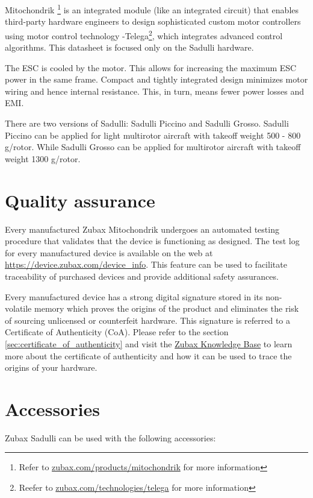 \documentclass{zubaxdoc}
\begin{document}
Mitochondrik \footnote{Refer to \url{zubax.com/products/mitochondrik} for more information} is an integrated module (like an integrated circuit) that enables third-party hardware engineers to design sophisticated custom motor controllers using motor control technology -Telega\footnote{Reefer to \url{zubax.com/technologies/telega} for more information}, which integrates advanced control algorithms.   
This datasheet is focused only on the Sadulli hardware.
  
The ESC is cooled by the motor. This allows for increasing the maximum ESC power in the same frame. Compact and tightly integrated design minimizes motor wiring and hence internal resistance. This, in turn, means fewer power losses and EMI. 

There are two versions of Sadulli: Sadulli Piccino and Sadulli Grosso. 
Sadulli Piccino can be applied for light multirotor aircraft with takeoff weight 500 - 800  g/rotor. While Sadulli Grosso can be applied for multirotor aircraft with takeoff weight 1300 g/rotor. 

\section{Quality assurance}

Every manufactured Zubax Mitochondrik undergoes an automated testing procedure that validates that
the device is functioning as designed.
The test log for every manufactured device is available on the web at
\url{https://device.zubax.com/device_info}.
This feature can be used to facilitate traceability of purchased devices and
provide additional safety assurances.

Every manufactured device has a strong digital signature stored in its non-volatile memory
which proves the origins of the product and eliminates the risk of sourcing unlicensed or
counterfeit hardware.
This signature is referred to a Certificate of Authenticity (CoA).
Please refer to the section \ref{sec:certificate_of_authenticity} and visit the
\href{https://kb.zubax.com}{Zubax Knowledge Base} to learn more about
the certificate of authenticity and how it can be used to trace the origins of your hardware.


\section{Accessories}

Zubax Sadulli can be used with the following accessories:
\end{document}

